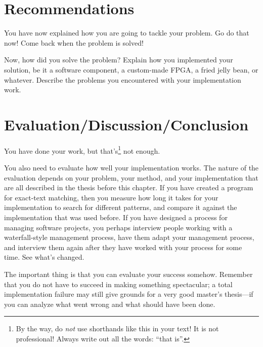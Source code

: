 \documentclass[12pt,a4paper,oneside,pdftex]{report}
\begin{document}
% 

\chapter{Recommendations}
\label{chapter:implementation}

You have now explained how you are going to tackle your problem.
Go do that now! Come back when the problem is solved!

Now, how did you solve the problem?
Explain how you implemented your solution, be it a software component, a
custom-made FPGA, a fried jelly bean, or whatever.
Describe the problems you encountered with your implementation work.



% 

\chapter{Evaluation/Discussion/Conclusion}
\label{chapter:evaluation}

You have done your work, but that's\footnote{By the way, do \emph{not} use
shorthands like this in your text! It is not professional! Always write out all
the words: ``that is''.} not enough.

You also need to evaluate how well your implementation works.  The
nature of the evaluation depends on your problem, your method, and
your implementation that are all described in the thesis before this
chapter.  If you have created a program for exact-text matching, then
you measure how long it takes for your implementation to search for
different patterns, and compare it against the implementation that was
used before.  If you have designed a process for managing software
projects, you perhaps interview people working with a waterfall-style
management process, have them adapt your management process, and
interview them again after they have worked with your process for some
time. See what's changed.

The important thing is that you can evaluate your success somehow.
Remember that you do not have to succeed in making something spectacular; a
total implementation failure may still give grounds for a very good master's
thesis---if you can analyze what went wrong and what should have been done.




% 
\end{document}
